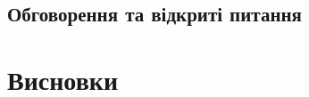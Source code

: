 \documentclass[a4paper,12pt]{article}
\begin{document}
    \subsection{Обговорення та відкриті питання} %

    \newpage
    \section*{Висновки} %

    \newpage
    \printbibliography %

\end{document}
